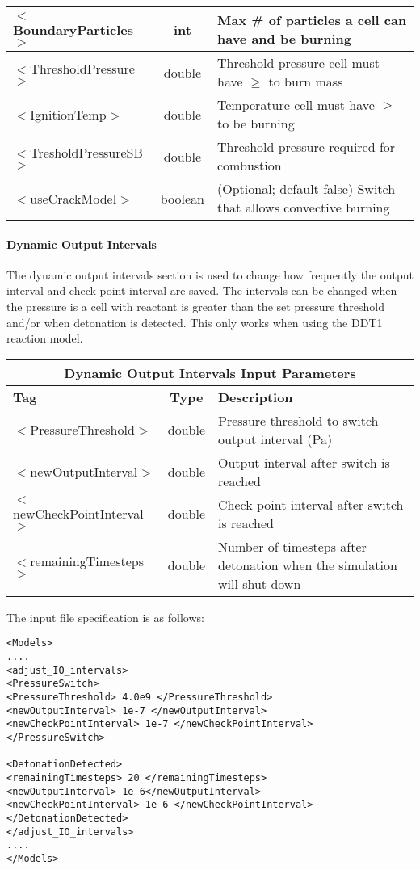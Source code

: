 \begin{center}
\begin{tabular}{| l | c | p{7cm} |}
\hline
  $<$BoundaryParticles$>$ & int & Max \# of particles a cell can have and be burning  \\
\hline
  $<$ThresholdPressure$>$ & double & Threshold pressure cell must have $\ge$ to burn mass \\
\hline
  $<$IgnitionTemp$>$ & double & Temperature cell must have $\ge$ to be burning \\
\hline
  $<$TresholdPressureSB$>$ & double & Threshold pressure required for combustion \\
\hline
  $<$useCrackModel$>$ & boolean & (Optional; default false) Switch that allows convective burning \\
\hline
\end{tabular}
\end{center}



\newpage
\paragraph{Dynamic Output Intervals} \label {Sec:DDT2}
The dynamic output intervals section is used to change how frequently the output interval and check point interval are saved. The intervals can be changed when the pressure is a cell with reactant is greater than the set pressure threshold and/or when detonation is detected. This only works when using the DDT1 reaction model.


\begin{center}
\begin{tabular}{| l | c | p{7cm} |}
\hline
  \multicolumn{3}{|c|}{\textbf{Dynamic Output Intervals Input Parameters}} \\
\hline
\hline
  \textbf{Tag} & \textbf{Type} & \textbf{Description}\\
\hline
  $<$PressureThreshold$>$ & double & Pressure threshold to switch output interval (Pa)\\
\hline
  $<$newOutputInterval$>$ & double & Output interval after switch is reached\\
\hline
  $<$newCheckPointInterval$>$ & double & Check point interval after switch is reached\\
\hline
  $<$remainingTimesteps$>$ & double & Number of timesteps after detonation when the simulation will shut down\\
\hline
\end{tabular}
\end{center}


The input file specification is as follows:
\begin{lstlisting}
<Models>
....
<adjust_IO_intervals>
<PressureSwitch>
<PressureThreshold> 4.0e9 </PressureThreshold>
<newOutputInterval> 1e-7 </newOutputInterval>
<newCheckPointInterval> 1e-7 </newCheckPointInterval>
</PressureSwitch>

<DetonationDetected>
<remainingTimesteps> 20 </remainingTimesteps>
<newOutputInterval> 1e-6</newOutputInterval>
<newCheckPointInterval> 1e-6 </newCheckPointInterval>
</DetonationDetected>
</adjust_IO_intervals>
....
</Models> 
\end{lstlisting}

